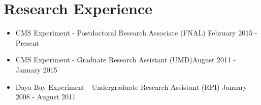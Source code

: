 \section{Research Experience}
\begin{itemize}[leftmargin=12pt]
\item CMS Experiment - Postdoctoral Research Associate (FNAL) \hfill February 2015 - Present%
\item CMS Experiment - Graduate Research Assistant (UMD)\hfill August 2011 - January 2015%
\item Daya Bay Experiment - Undergraduate Research Assistant (RPI) \hfill January 2008 - August 2011%
\end{itemize}
